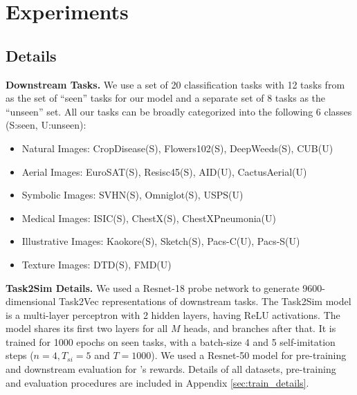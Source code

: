 
\section{Experiments} \label{sec:expts}

\subsection{Details} \label{subsec:expts_details}

\noindent \textbf{Downstream Tasks.} We use a set of 20 classification tasks with
12 tasks from \cite{islam2021broad} as the set of ``seen'' tasks for our model and a separate set of 8 tasks as the ``unseen'' set.
All our tasks can be broadly categorized into the following 6 classes (S:seen, U:unseen): 
\begin{itemize}
\vspace{-0.5em}
\itemsep-0.2em
\item Natural Images: CropDisease(S)\cite{mohanty2016cropdisease}, Flowers102(S)\cite{nilsback2008automatedflowers102}, DeepWeeds(S)\cite{DeepWeeds2019}, CUB(U)\cite{WahCUB_200_2011}
\item Aerial Images: EuroSAT(S)\cite{helber2019eurosat}, Resisc45(S)\cite{cheng2017remoteresisc45}, AID(U)\cite{xia2017aid}, CactusAerial(U)\cite{lopez2019columnarCactusAerial}
\item Symbolic Images: SVHN(S)\cite{netzer2011readingsvhn}, Omniglot(S)\cite{lake2015humanomniglot}, USPS(U)\cite{hull1994databaseUSPS}
\item Medical Images: ISIC(S)\cite{codella2019skinisic}, ChestX(S)\cite{wang2017chestx}, ChestXPneumonia(U)\cite{kermany2018identifyingChestXP}
\item Illustrative Images: Kaokore(S)\cite{tian2020kaokore}, Sketch(S)\cite{wang2019learningsketch}, Pacs-C(U), Pacs-S(U)\cite{li2017deeperPACS}
\item Texture Images: DTD(S)\cite{cimpoi2014DTD}, FMD(U)\cite{zhang2019poissonFMD}
\end{itemize}
\vspace{-0.3em}

\noindent \textbf{Task2Sim Details.} We used a Resnet-18 probe network to generate 9600-dimensional Task2Vec representations of downstream tasks. The Task2Sim model is a multi-layer perceptron with 2 hidden layers, having ReLU activations. The model shares its first two layers for all $M$ heads, and branches after that. It is trained for 1000 epochs on seen tasks, with a batch-size 4 and 5 self-imitation steps (\ie $n=4, T_{si} = 5$ and $T = 1000$). We used a Resnet-50 model for pre-training and downstream evaluation for \ours's rewards. Details of all datasets, pre-training and evaluation procedures are included in Appendix \ref{sec:train_details}.


